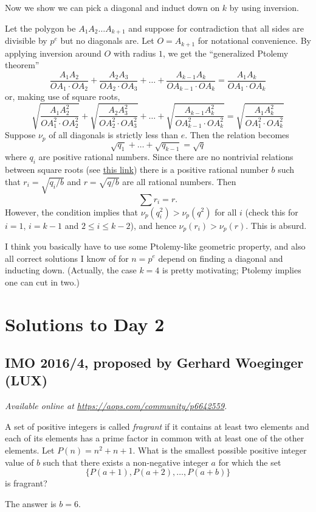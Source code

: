 \documentclass[11pt]{scrartcl}
\begin{document}
Now we show we can pick a diagonal and induct down on $k$ by using inversion.

Let the polygon be $A_1 A_2 \dots A_{k+1}$
and suppose for contradiction that all sides are divisible by $p^e$
but no diagonals are.
Let $O = A_{k+1}$ for notational convenience.
By applying inversion around $O$ with radius $1$,
we get the ``generalized Ptolemy theorem''
\[
  \frac{A_1A_2}{OA_1 \cdot OA_2}
  + \frac{A_2A_3}{OA_2 \cdot OA_3}
  + \dots
  + \frac{A_{k-1} A_k}{OA_{k-1} \cdot OA_k}
  = \frac{A_1 A_k}{OA_1 \cdot OA_k}
\]
or, making use of square roots,
\[
  \sqrt{\frac{A_1A_2^2}{OA_1^2 \cdot OA_2^2}}
  + \sqrt{\frac{A_2A_3^2}{OA_2^2 \cdot OA_3^2}}
  + \dots
  + \sqrt{\frac{A_{k-1} A_k^2}{OA_{k-1}^2 \cdot OA_k^2}}
  = \sqrt{\frac{A_1 A_k^2}{OA_1^2 \cdot OA_k^2}}
\]
Suppose $\nu_p$ of all diagonals is strictly less than $e$.
Then the relation becomes
\[ \sqrt{q_1} + \dots + \sqrt{q_{k-1}} = \sqrt q \]
where $q_i$ are positive rational numbers.
Since there are no nontrivial relations between square roots
(see \href{https://qchu.wordpress.com/2009/07/02/square-roots-have-no-unexpected-linear-relationships/}{this link})
there is a positive rational number $b$
such that $r_i = \sqrt{q_i/b}$ and $r = \sqrt{q/b}$
are all rational numbers.
Then
\[ \sum r_i = r. \]
However, the condition implies that $\nu_p(q_i^2) > \nu_p(q^2)$ for all $i$
(check this for $i=1$, $i=k-1$ and $2 \le i \le k-2$),
and hence $\nu_p(r_i) > \nu_p(r)$.
This is absurd.

\begin{remark*}
  I think you basically have to use some Ptolemy-like geometric property,
  and also all correct solutions I know of for $n = p^e$
  depend on finding a diagonal and inducting down.
  (Actually, the case $k=4$ is pretty motivating;
  Ptolemy implies one can cut in two.)
\end{remark*}
\pagebreak

\section{Solutions to Day 2}
\subsection{IMO 2016/4, proposed by Gerhard Woeginger (LUX)}
\textsl{Available online at \url{https://aops.com/community/p6642559}.}
\begin{mdframed}[style=mdpurplebox,frametitle={Problem statement}]
A set of positive integers is called \emph{fragrant}
if it contains at least two elements and each of its elements
has a prime factor in common with at least one of the other elements.
Let $P(n)=n^2+n+1$.
What is the smallest possible positive integer value of $b$ such that
there exists a non-negative integer $a$ for which the set
\[ \{P(a+1),P(a+2),\dots,P(a+b)\} \]
is fragrant?
\end{mdframed}
The answer is $b = 6$.
\end{document}
